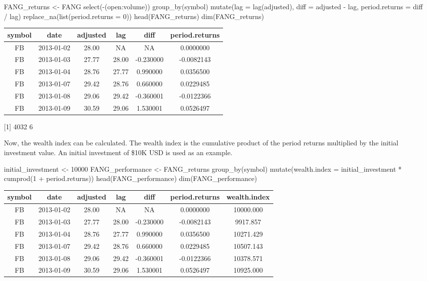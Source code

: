 \begin{Schunk}
\begin{Sinput}
FANG_returns <- FANG %
    select(-(open:volume)) %
    group_by(symbol) %
    mutate(lag = lag(adjusted),
           diff = adjusted - lag,
           period.returns = diff / lag) %
    replace_na(list(period.returns = 0)) 
head(FANG_returns)
dim(FANG_returns)
\end{Sinput}
\end{Schunk}

\begin{tabular}{cccccc}
\toprule
symbol & date & adjusted & lag & diff & period.returns\\
\midrule
FB & 2013-01-02 & 28.00 & NA & NA & 0.0000000\\
FB & 2013-01-03 & 27.77 & 28.00 & -0.230000 & -0.0082143\\
FB & 2013-01-04 & 28.76 & 27.77 & 0.990000 & 0.0356500\\
FB & 2013-01-07 & 29.42 & 28.76 & 0.660000 & 0.0229485\\
FB & 2013-01-08 & 29.06 & 29.42 & -0.360001 & -0.0122366\\
FB & 2013-01-09 & 30.59 & 29.06 & 1.530001 & 0.0526497\\
\bottomrule
\end{tabular}

{[}1{]} 4032 6

\hspace{20 mm}

Now, the wealth index can be calculated. The wealth index is the
cumulative product of the period returns multiplied by the initial
investment value. An initial investment of \$10K USD is used as an
example.

\begin{Schunk}
\begin{Sinput}
initial_investment <- 10000
FANG_performance <- FANG_returns %
    group_by(symbol) %
    mutate(wealth.index = initial_investment * cumprod(1 + period.returns)) 
head(FANG_performance)
dim(FANG_performance)
\end{Sinput}
\end{Schunk}

\begin{tabular}{ccccccc}
\toprule
symbol & date & adjusted & lag & diff & period.returns & wealth.index\\
\midrule
FB & 2013-01-02 & 28.00 & NA & NA & 0.0000000 & 10000.000\\
FB & 2013-01-03 & 27.77 & 28.00 & -0.230000 & -0.0082143 & 9917.857\\
FB & 2013-01-04 & 28.76 & 27.77 & 0.990000 & 0.0356500 & 10271.429\\
FB & 2013-01-07 & 29.42 & 28.76 & 0.660000 & 0.0229485 & 10507.143\\
FB & 2013-01-08 & 29.06 & 29.42 & -0.360001 & -0.0122366 & 10378.571\\
FB & 2013-01-09 & 30.59 & 29.06 & 1.530001 & 0.0526497 & 10925.000\\
\bottomrule
\end{tabular}

